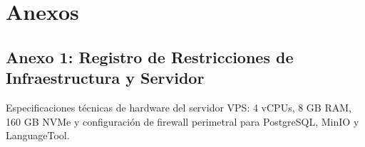 \documentclass[12pt,a4paper]{article}
\begin{document}
\vspace{0.4cm}

\section{Anexos}
\subsection*{Anexo 1: Registro de Restricciones de Infraestructura y Servidor}
Especificaciones técnicas de hardware del servidor VPS: 4 vCPUs, 8 GB RAM, 160 GB NVMe y configuración de firewall perimetral para PostgreSQL, MinIO y LanguageTool.
\end{document}
